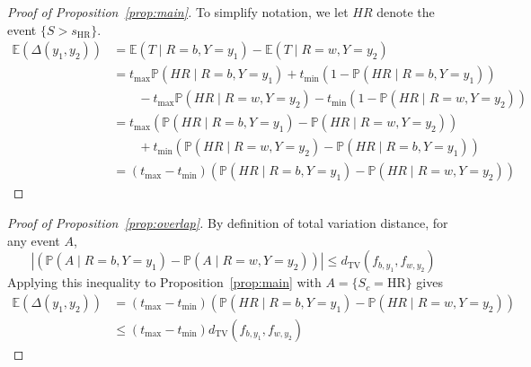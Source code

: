 \documentclass[11pt, svgnames]{article}
\newcommand{\E}{\mathbb{E}}
\renewcommand{\P}{\mathbb{P}}
\numberwithin{equation}{section}
\theoremstyle{plain}
\theoremstyle{definition}
\numberwithin{prop}{section}
\numberwithin{corollary}{section}
\begin{document}
\begin{proof}[Proof of Proposition~\ref{prop:main}]  To simplify notation, we let $HR$ denote the event $\{S > s_\mathrm{HR}\}$.
  \begin{align*}
  \E(\Delta(y_1, y_2)) &= \E(T \mid R = b, Y = y_1) - \E(T \mid R = w, Y = y_2) \\
    &= t_\mathrm{max}\P(HR \mid R = b, Y = y_1) + t_\mathrm{min}(1 - \P(HR \mid R = b, Y = y_1)) \\
    & \qquad - t_\mathrm{max}\P(HR \mid R = w, Y = y_2) - t_\mathrm{min}(1 - \P(HR \mid R = w, Y = y_2)) \\
    &= t_\mathrm{max}(\P(HR \mid R = b, Y = y_1) - \P(HR \mid R = w, Y = y_2)) \\      & \qquad + t_\mathrm{min}(\P(HR \mid R = w, Y = y_2) - \P(HR \mid R = b, Y = y_1)) \\
    &= (t_\mathrm{max} - t_\mathrm{min})(\P(HR \mid R = b, Y = y_1) - \P(HR \mid R = w, Y = y_2))
  \end{align*}
\end{proof}

\begin{proof}[Proof of Proposition~\ref{prop:overlap}]
  By definition of total variation distance, for any event $A$,
  \[
  \left|(\P(A\mid R = b, Y = y_1) - \P(A \mid R = w, Y = y_2))\right| \le 
    d_\mathrm{TV}(f_{b,y_1}, f_{w,y_2})
  \]
  Applying this inequality to Proposition~\ref{prop:main} with $A = \{S_c = \mathrm{HR}\}$ gives
  \begin{align*}
    \E(\Delta(y_1, y_2)) &= (t_\mathrm{max} - t_\mathrm{min})(\P(HR \mid R = b, Y = y_1) - \P(HR \mid R = w, Y = y_2)) \\
    &\le (t_\mathrm{max} - t_\mathrm{min}) d_\mathrm{TV}(f_{b,y_1}, f_{w,y_2})
  \end{align*}
\end{proof}
\end{document}
